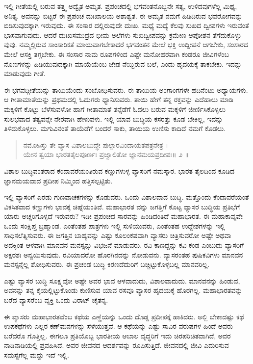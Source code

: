 ಇಲ್ಲಿ ಗೀತೆಯಲ್ಲಿ ಬರುವ ತತ್ತ್ವ ಅದ್ವೈತ ಅಮೃತ. ಪ್ರಪಂಚದಲ್ಲಿ ಭಗವಂತನೊಬ್ಬನೇ ಸತ್ಯ, ಉಳಿದವುಗಳೆಲ್ಲ ಮಿಥ್ಯ, ಅನಿತ್ಯ. ಅವನನ್ನು ಬಿಟ್ಟರೆ ಈ ಪ್ರಪಂಚ ದುಃಖಾಲಯ ಅಶಾಶ್ವತ. ಈ ಅಮೃತ ನಮಗೆ ಹಿಡಿದಿರುವ ಭವರೋಗವನ್ನು ಬಿಡಿಸುವುದಕ್ಕಾಗಿ ಇರುವುದು. ಈ ಸಂಸಾರ ದಲ್ಲಿರುವುದೇ ದುಃಖ. ಮಧ್ಯೆ ಮಧ್ಯೆ ಕೆಲವು ಸುಖದ ದ್ವೀಪಗಳು ಇರುವಂತೆ ಭಾಸವಾಗುವುದು. ಆದರೆ ದುಃಖಸಮುದ್ರದ ಭೀಮ ಅಲೆಗಳು ಸುಖದ್ವೀಪವನ್ನು ಕ್ರಮೇಣ ಆಪೋಶನ ತೆಗೆದುಕೊಳ್ಳು ವುವು. ನಮ್ಮಲ್ಲಿರುವ ಸಾಂಸಾರಿಕತೆ ಮಾಯವಾಗಬೇಕಾದರೆ ಭಗವಂತನ ಮೇಲೆ ಭಕ್ತಿ ಉದ್ದೀಪನೆ ಆಗಬೇಕು, ಸಂಸಾರದ ಮೇಲೆ ಆಸಕ್ತಿ ತಗ್ಗಬೇಕು. ಈ ಸಂಸಾರ ನಾಮ ರೂಪಗಳಿಂದ ಎಷ್ಟೇ ಮನೋಹರವಾಗಿ ಕಂಡರೂ ಜೀವಿಗಳೆಂಬ ನೊಣಗಳನ್ನು ಹಿಡಿಯುವುದಕ್ಕಾಗಿ ಮಾಯೆಯೆಂಬ ಜೇಡ ನೆಯ್ದಿರುವ ಬಲೆ, ಎಂದು ಹೃದಯಕ್ಕೆ ತಾಕಬೇಕು. ಇದನ್ನು ಮಾಡುವುದು ಗೀತೆ.

ಈ ಭಗವದ್ಗೀತೆಯನ್ನು ತಾಯಿಯೆಂದು ಸಂಬೋಧಿಸುವರು. ಈ ತಾಯಿಯ ಅಂಗಾಂಗಗಳೇ ಹದಿನೆಂಟು ಅಧ್ಯಾಯಗಳು. ಆ ಗೀತಾಮಾತೆಯನ್ನು ಪ್ರಥಮದಲ್ಲಿ ಓದುಗರು ಧ್ಯಾನಿಸುವರು. ತಾಯಿ ಹೇಗೆ ತನ್ನ ರಕ್ತವನ್ನು ಎದೆಹಾಲು ಮಾಡಿ ಮಕ್ಕಳಿಗೆ ಕೊಟ್ಟು ಬೆಳೆಸುವಳೋ ಹಾಗೆ ಗೀತಾಮಾತೆ ತನ್ನೆಡೆಗೆ ಓದಲು ಬರುವ ಮಕ್ಕಳಿಗೆ ಜೀರ್ಣಿಸಿಕೊಳ್ಳಲು ಸುಲಭವಾದ ತತ್ವವನ್ನೇ ನೇರವಾಗಿ ಹೇಳುವಳು. ಇಲ್ಲಿ ಯಾವ ಬುದ್ಧಿಯ ಕಸರತ್ತು ಕೂಡ ಬೇಕಿಲ್ಲ, ಇದನ್ನು ತಿಳಿದುಕೊಳ್ಳಲು. ಮಗುವಿನಂತೆ ತಾಯೆಡೆಗೆ ಬಂದರೆ ಸಾಕು, ತಾಯಿಯ ಉಣಿಸು ಕಾದಿದೆ ನಮಗೆ ಕೊಡಲು.

\begin{verse}
ನಮೋsಸ್ತು ತೇ ವ್ಯಾಸ ವಿಶಾಲಬುದ್ಧೇ ಪುಲ್ಲಾರವಿಂದಾಯತಪತ್ರನೇತ್ರ ।\\ಯೇನ ತ್ವಯಾ ಭಾರತತೈಲಪೂರ್ಣಃ ಪ್ರಜ್ವಾಲಿತೋ ಜ್ಞಾನಮಯಪ್ರದೀಪಃ\num{॥ ೨ ॥}
\end{verse}

{\small ವಿಶಾಲ ಬುದ್ಧಿವಂತರಾದ ಕೆಂದಾವರೆಯಂತಿರುವ ಕಣ್ಣುಗಳುಳ್ಳ ವ್ಯಾಸರಿಗೆ ನಮಸ್ಕಾರ. ಭಾರತ ತೈಲದಿಂದ ಕೂಡಿದ ಜ್ಞಾನಮಯವಾದ ಪ್ರದೀಪ ನಿಮ್ಮಿಂದ ಹತ್ತಿಸಲ್ಪಟ್ಟಿತು.}

ಇಲ್ಲಿ ವ್ಯಾಸರಿಗೆ ಎರಡು ಗುಣವಾಚಕಗಳನ್ನು ಕೊಡುವರು. ಒಂದು ವಿಶಾಲವಾದ ಬುದ್ಧಿ. ಮತ್ತೊಂದು ಕೆಂದಾವರೆಯಂತೆ ವಿಕಸಿತವಾದ ಕಣ್ಣುಗಳು ಭಾವಕ್ಕೆ ಚಿಹ್ನೆಯಂತಿವೆ. ಮಹಾಭಾರತ ವನ್ನು ಜಗತ್ತಿಗೆ ಕೊಟ್ಟ ವ್ಯಾಸರ ಬುದ್ಧಿಯ ಪ್ರತಿಭೆಗೆ ಯಾರು ಅಚ್ಚರಿಗೊಳ್ಳದೆ ಇರುವರು? ಇಡೀ ಪ್ರಪಂಚದ ಸಾರವನ್ನು ಹಿಂಡಿದಂತಿದೆ ಮಹಾಭಾರತ. ಈ ಮಹಾಕಾವ್ಯವೇ ಒಂದು ಸಂಕ್ಷಿಪ್ತ ಬ್ರಹ್ಮಾಂಡ. ಎಂತೆಂತಹ ಪಾತ್ರಗಳು ಇಲ್ಲಿ ಸುಳಿಯುವರು, ಎಂತೆಂತಹ ಉದ್ದೇಶಗಳನ್ನು ಇಲ್ಲಿ ಸಾಧಿಸಲೆತ್ನಿಸುವರು. ಈ ಜಗತ್ತಿನ ಬಾಹ್ಯವನ್ನು ಎಷ್ಟು ಕೂಲಂಕಷವಾಗಿ ವ್ಯಾಸರು ಚಿತ್ರಿಸುವರೋ ಅಷ್ಟೇ ಅಥವಾ ಅದಕ್ಕಿಂತ ಆಳವಾಗಿ ಮಾನವನ ಮನಸ್ಸನ್ನು ವಿಭಜನೆ ಮಾಡುವರು. ರವಿ ಕಾಣದ್ದನ್ನು ಕವಿ ಕಂಡ ಎಂಬುದು ವ್ಯಾಸರಿಗೆ ಅಕ್ಷರಶಃ ಅನ್ವಯಿಸುವುದು. ರವಿಯಾದರೋ ಹೊರಗಿನದನ್ನು ನೋಡುವನು. ವ್ಯಾಸರಂತಹ ಪುಷಿಕವಿಗಳು ಮಾನವನ ಮನಸ್ಸನ್ನೆಲ್ಲ ಶೋಧಿಸುವರು. ಈ ಪ್ರಚಂಡ ಬುದ್ಧಿ ಕಿರಣದೆದುರಿಗೆ ಬಚ್ಚಿಟ್ಟುಕೊಳ್ಳಬಲ್ಲ ಮಾನವರಿಲ್ಲ.

ಎಷ್ಟು ವ್ಯಾಸರ ಬುದ್ಧಿ ಸೂಕ್ಷ್ಮವೋ ಅಷ್ಟೇ ಅವರ ಭಾವ ಆಳವಾದುದು, ವಿಶಾಲವಾದುದು. ಮಾನವನನ್ನು ಹಿಂಡುವ, ಅವನನ್ನು ತನ್ನ ಕೈಯಲ್ಲಿಟ್ಟುಕೊಂಡು ಕುಣಿಸುವ ಯಾವ ರಸವೂ ವ್ಯಾಸರ ಹೃದಯಕ್ಕೆ ಹೊರಗಲ್ಲ. ಮಹಾಭಾರತವನ್ನು ಬರೆದ ವ್ಯಾಸರೆಂಬ ವ್ಯಕ್ತಿ ಒಂದು ವಿರಾಟ್ ಚೈತನ್ಯ.

ಈ ವ್ಯಾಸರು ಮಹಾಭಾರತವೆಂಬ ಕಥೆಯ ಎಣ್ಣೆಯನ್ನು ಒಂದು ದೊಡ್ಡ ಪ್ರದೀಪಕ್ಕೆ ಹಾಕಿದರು. ಅಲ್ಲಿ ಬೇಕಾದಷ್ಟು ಕಥೆ ಉಪಕಥೆಗಳು ಎಲ್ಲರ ಕಣ್​ಮನಗಳನ್ನು ಸೆಳೆಯುತ್ತವೆ. ಆ ಕಥೆಯನ್ನು ಎಷ್ಟು ಸಾವಿರ ವರುಷಗಳ ಹಿಂದೆ ಅವರು ಬರೆದರೊ ಗೊತ್ತಿಲ್ಲ. ಈಗಲೂ ಪ್ರತಿಯೊಬ್ಬ ಭಾರತೀಯ ಆಬಾಲ ವೃದ್ಧರಿಗೆ ಇದು ಚಿರಪರಿಚಿತವಾಗಿದೆ, ಅವರ ನಾಡಿನಾಡಿಯಲ್ಲಿ ಪ್ರವಹಿಸಿದೆ. ಅವರ ಜೀವನದ ಆದರ್ಶವನ್ನು ರೂಪಿಸುತ್ತಿದೆ. ಜೀವನದಲ್ಲಿ ಜೀವಿ ಎದುರಿಸುವ ಸಮಸ್ಯೆಗೆಲ್ಲ ಮದ್ದು ಇದೆ ಇಲ್ಲಿ.

